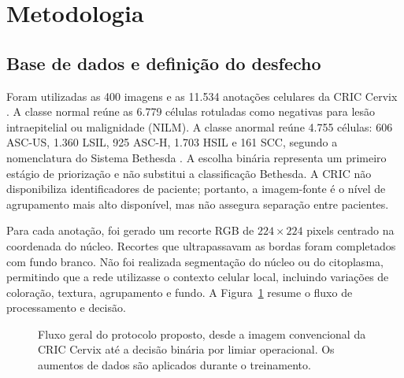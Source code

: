﻿\section{Metodologia}

\subsection{Base de dados e definição do desfecho}

Foram utilizadas as 400 imagens e as 11.534 anotações celulares da CRIC
Cervix \cite{rezende2021cric}. A classe normal reúne as 6.779 células rotuladas
como negativas para lesão intraepitelial ou malignidade (NILM). A classe
anormal reúne 4.755 células: 606 ASC-US, 1.360 LSIL, 925 ASC-H, 1.703 HSIL e
161 SCC, segundo a nomenclatura do Sistema Bethesda
\cite{nayar2015bethesda}. A escolha binária representa um primeiro estágio de
priorização e não substitui a classificação Bethesda. A CRIC não disponibiliza
identificadores de paciente; portanto, a imagem-fonte é o nível de agrupamento
mais alto disponível, mas não assegura separação entre pacientes.


Para cada anotação, foi gerado um recorte RGB de $224\times224$ pixels centrado
na coordenada do núcleo. Recortes que ultrapassavam as bordas foram completados
com fundo branco. Não foi realizada segmentação do núcleo ou do citoplasma,
permitindo que a rede utilizasse o contexto celular local, incluindo variações
de coloração, textura, agrupamento e fundo. A Figura~\ref{fig:pipeline}
resume o fluxo de processamento e decisão.

\begin{figure}[ht]
\centering
{}
\caption{Fluxo geral do protocolo proposto, desde a imagem convencional da
CRIC Cervix até a decisão binária por limiar operacional. Os aumentos de dados
são aplicados durante o treinamento.}
\label{fig:pipeline}
\end{figure}

